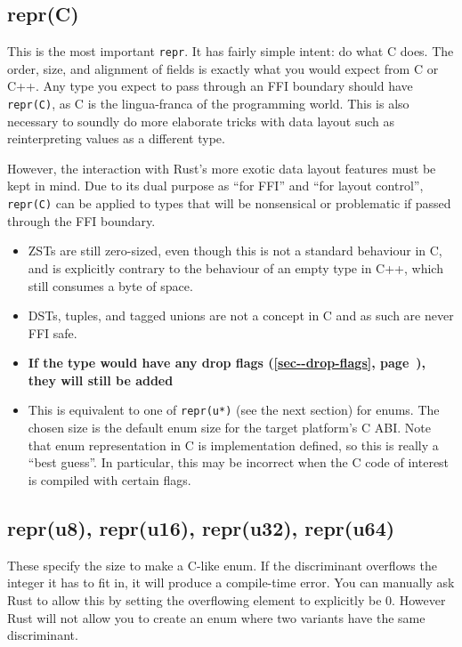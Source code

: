\documentclass[a4paper,]{book}
\renewcommand*{\hyperref}[2][\ar]{%
  \def\ar{#2}%
  #2 (\autoref{#1}, page~\pageref{#1})}
\begin{document}
\subsection{repr(C)}\label{reprc}

This is the most important \texttt{repr}. It has fairly simple intent:
do what C does. The order, size, and alignment of fields is exactly what
you would expect from C or C++. Any type you expect to pass through an
FFI boundary should have \texttt{repr(C)}, as C is the lingua-franca of
the programming world. This is also necessary to soundly do more
elaborate tricks with data layout such as reinterpreting values as a
different type.

However, the interaction with Rust's more exotic data layout features
must be kept in mind. Due to its dual purpose as ``for FFI'' and ``for
layout control'', \texttt{repr(C)} can be applied to types that will be
nonsensical or problematic if passed through the FFI boundary.

\begin{itemize}
\item
  ZSTs are still zero-sized, even though this is not a standard
  behaviour in C, and is explicitly contrary to the behaviour of an
  empty type in C++, which still consumes a byte of space.
\item
  DSTs, tuples, and tagged unions are not a concept in C and as such are
  never FFI safe.
\item
  \textbf{If the type would have any \hyperref[sec--drop-flags]{drop
  flags}, they will still be added}
\item
  This is equivalent to one of \texttt{repr(u*)} (see the next section)
  for enums. The chosen size is the default enum size for the target
  platform's C ABI. Note that enum representation in C is implementation
  defined, so this is really a ``best guess''. In particular, this may
  be incorrect when the C code of interest is compiled with certain
  flags.
\end{itemize}

\subsection{repr(u8), repr(u16), repr(u32),
repr(u64)}\label{repru8-repru16-repru32-repru64}

These specify the size to make a C-like enum. If the discriminant
overflows the integer it has to fit in, it will produce a compile-time
error. You can manually ask Rust to allow this by setting the
overflowing element to explicitly be 0. However Rust will not allow you
to create an enum where two variants have the same discriminant.
\end{document}

